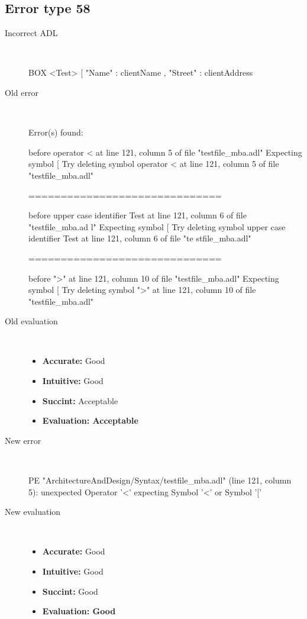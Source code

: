 \hrulefill

\subsection{Error type 58}
  \begin{description}
  \item[Incorrect ADL]~\\
\begin{adl}
BOX <Test> [ "Name"   : clientName
    , "Street" : clientAddress\end{adl}
  \item[Old error]~\\
\begin{haskell}
Error(s) found:

before operator < at line 121, column 5 of file "testfile_mba.adl"
Expecting symbol [
Try deleting symbol operator < at line 121, column 5 of file "testfile_mba.adl"

==============================

before upper case identifier Test at line 121, column 6 of file "testfile_mba.ad
l"
Expecting symbol [
Try deleting symbol upper case identifier Test at line 121, column 6 of file "te
stfile_mba.adl"

==============================

before ">" at line 121, column 10 of file "testfile_mba.adl"
Expecting symbol [
Try deleting symbol ">" at line 121, column 10 of file "testfile_mba.adl"
\end{haskell}
  \item[Old evaluation]~\\
    \begin{itemize}
    \item \textbf{Accurate:} Good
    \item \textbf{Intuitive:} Good
    \item \textbf{Succint:} Acceptable
    \item \textbf{Evaluation: Acceptable}
    \end{itemize}
  \item[New error]~\\
\begin{haskell}
PE "ArchitectureAndDesign/Syntax/testfile_mba.adl" (line 121, column 5):
unexpected Operator '<'
expecting Symbol '<' or Symbol '['
\end{haskell}
  \item[New evaluation]~\\
    \begin{itemize}
    \item \textbf{Accurate:} Good
    \item \textbf{Intuitive:} Good
    \item \textbf{Succint:} Good
    \item \textbf{Evaluation: Good
}
    \end{itemize}
  \end{description}

